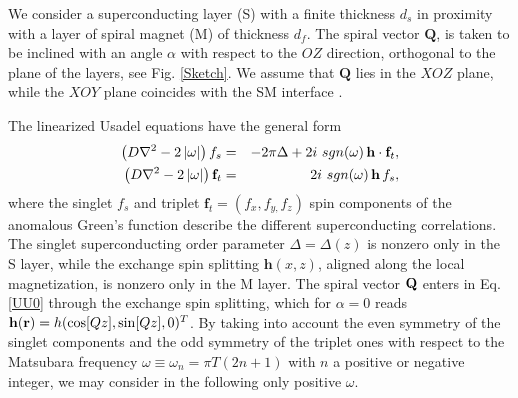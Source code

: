 \documentclass[prb,amsmath,amssymb,reprint]{revtex4-2}
\begin{document}
We consider a superconducting layer (S) with a finite thickness $d_{s}$ in proximity with a layer of spiral magnet (M) of thickness $d_{f}$. The spiral vector $\mathbf{Q}$, is taken to be inclined with an angle $\alpha$ with respect to the $OZ$ direction, orthogonal to the plane of the layers, see Fig. \ref{Sketch}.  We assume that $\mathbf{Q}$ lies in the $XOZ$ plane, while the $XOY$ plane coincides with the SM interface \cite{note}.


The linearized Usadel equations have the general form \cite{Champel2005,Champel2005b}
\begin{eqnarray}
\left( D\nabla ^{2}-2\left\vert \omega \right\vert \right) f_{s} &=&-2\pi
\Delta +2i\ sgn(\omega ) \, {\bf h}\cdot {\bf f}_{t},
\notag \\
\left( D\nabla ^{2}-2\left\vert \omega \right\vert \right) {\bf
f}_{t} &=&2i\ sgn(\omega ) \, {\bf h} \, f_{s},  \label{UU0}
\end{eqnarray}
where the singlet $f_{s}$ and triplet $\mathbf{f}_{t}=(f_{x},f_{y,}f_{z})$
spin components of the anomalous Green's function describe the different superconducting correlations. The singlet superconducting order parameter $\Delta = \Delta(z)$ is nonzero only in the S layer, while the exchange spin splitting $\mathbf{h}(x,z)$, aligned along the local magnetization, is nonzero only in the M layer.
The spiral vector ${\bf Q}$ enters in Eq. \eqref{UU0} through the exchange spin splitting, which for $\alpha=0$  reads ${\bf h}({\bf r})=h (\cos [Qz], \sin [Q z], 0)^{T}$.
 By taking into account the even symmetry of the singlet components and the odd
symmetry of the triplet ones with respect to the Matsubara frequency $\omega
\equiv \omega _{n}=\pi T(2n+1)$ with $n$ a positive or negative integer, we may consider in the following only positive $\omega$.
\end{document}
